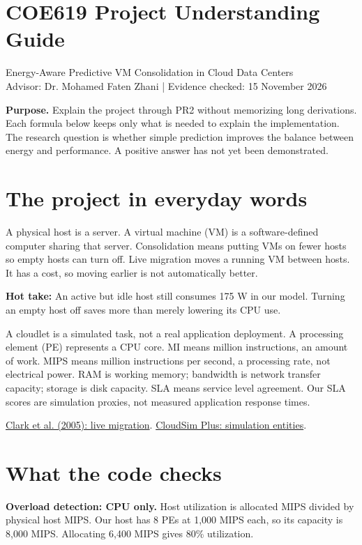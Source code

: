 \documentclass[11pt,a4paper]{article}
\newcommand{\hot}[1]{\par\textbf{Hot take:} #1\par}
\begin{document}
\section*{COE619 Project Understanding Guide}
Energy-Aware Predictive VM Consolidation in Cloud Data Centers\\
Advisor: Dr. Mohamed Faten Zhani | Evidence checked: 15 November 2026

\textbf{Purpose.} Explain the project through PR2 without memorizing long derivations. Each formula below keeps only what is needed to explain the implementation. The research question is whether simple prediction improves the balance between energy and performance. A positive answer has not yet been demonstrated.

\section{The project in everyday words}
A physical host is a server. A virtual machine (VM) is a software-defined computer sharing that server. Consolidation means putting VMs on fewer hosts so empty hosts can turn off. Live migration moves a running VM between hosts. It has a cost, so moving earlier is not automatically better.

\hot{An active but idle host still consumes 175 W in our model. Turning an empty host off saves more than merely lowering its CPU use.}

A cloudlet is a simulated task, not a real application deployment. A processing element (PE) represents a CPU core. MI means million instructions, an amount of work. MIPS means million instructions per second, a processing rate, not electrical power. RAM is working memory; bandwidth is network transfer capacity; storage is disk capacity. SLA means service level agreement. Our SLA scores are simulation proxies, not measured application response times.

\href{https://www.usenix.org/conference/nsdi-05/live-migration-virtual-machines}{Clark et al. (2005): live migration}. \href{https://javadoc.io/doc/org.cloudsimplus/cloudsim-plus/8.0.0/index.html}{CloudSim Plus: simulation entities}.

\section{What the code checks}
\textbf{Overload detection: CPU only.} Host utilization is allocated MIPS divided by physical host MIPS. Our host has 8 PEs at 1,000 MIPS each, so its capacity is 8,000 MIPS. Allocating 6,400 MIPS gives 80\% utilization.
\end{document}
